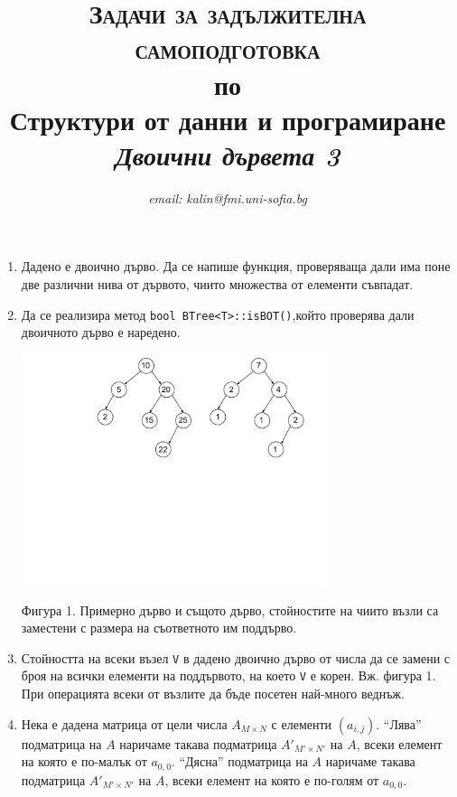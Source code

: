 \documentclass[12pt,a4paper]{article}
\author{\textit{email: kalin@fmi.uni-sofia.bg}}
\title{\textsc{Задачи за задължителна самоподготовка} \\
по \\
Структури от данни и програмиране\\
\textit{Двоични дървета 3}}
\begin{document}
\maketitle


\begin{enumerate}

	\item Дадено е двоично дърво. Да се напише функция, проверяваща дали има поне две различни нива от дървото, чиито множества от елементи съвпадат.

	\item Да се реализира метод \texttt{bool BTree<T>::isBOT()},който проверява дали двоичното дърво е наредено.


	\begin{flushleft}
	\includegraphics[width=9cm]{images/tree1}

	\vspace{-100px}

	Фигура 1. Примерно дърво и същото дърво, стойностите на чиито възли са заместени с размера на съответното им поддърво.
	\end{flushleft}

	\item Стойността на всеки възел \texttt{V} в дадено двоично дърво от числа да се замени с броя на всички елементи на поддървото, на което \texttt{V} е корен. Вж. фигура 1. При операцията всеки от възлите да бъде посетен най-много веднъж.

	\item Нека е дадена матрица от цели числа $A_{M\times N}$ с елементи $(a_{i,j})$. ``Лява'' подматрица на $A$ наричаме такава подматрица $A'_{M'\times N'}$ на $A$, всеки елемент на която е по-малък от $a_{0,0}$. ``Дясна'' подматрица на $A$ наричаме такава подматрица $A'_{M'\times N'}$ на $A$, всеки елемент на която е по-голям от $a_{0,0}$.



\end{enumerate}
\end{document}
